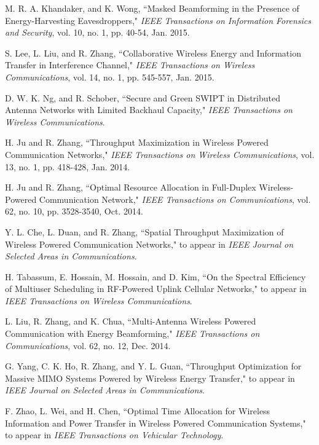 \documentclass[twocolumn,10pt]{IEEEtran}
\begin{document}
\begin{thebibliography}{99}
M. R. A. Khandaker, and K. Wong, ``Masked Beamforming in the Presence of Energy-Harvesting Eavesdroppers," 
\emph{IEEE Transactions on Information Forensics and Security}, vol. 10, no. 1, pp. 40-54, Jan. 2015.

S. Lee, L. Liu, and R. Zhang, 
``Collaborative Wireless Energy and Information Transfer in Interference Channel,"
\emph{IEEE Transactions on Wireless Communications}, 
vol. 14, no. 1,	 pp. 545-557, Jan.  2015.

D. W. K. Ng, and R. Schober, ``Secure and Green SWIPT in Distributed Antenna Networks with Limited Backhaul Capacity," \emph{IEEE Transactions on Wireless Communications}. 

H. Ju and R. Zhang, ``Throughput Maximization in Wireless Powered Communication Networks," \emph{IEEE Transactions on Wireless Communications}, vol. 13, no. 1, pp. 418-428, Jan. 2014. 

H. Ju and R. Zhang, ``Optimal Resource Allocation in Full-Duplex Wireless-Powered Communication Network,"  \emph{IEEE Transactions on Communications},  vol. 62, no. 10,	pp. 3528-3540, Oct. 2014.

Y. L. Che, L. Duan, and R. Zhang, ``Spatial Throughput Maximization of Wireless Powered Communication Networks," to appear in \emph{IEEE Journal on Selected Areas in Communications}. 

H. Tabassum,  E.  Hossain, M.  Hossain, and D. Kim, ``On the Spectral Efficiency of Multiuser Scheduling in RF-Powered Uplink Cellular Networks," to appear in \emph{IEEE Transactions on Wireless Communications}.  







L. Liu, R. Zhang, and K. Chua, ``Multi-Antenna Wireless Powered Communication with Energy Beamforming,"  \emph{IEEE Transactions on Communications}, vol. 62, no. 12, Dec. 2014.

G. Yang, C. K. Ho, R. Zhang, and Y. L. Guan, ``Throughput Optimization for Massive MIMO Systems Powered by Wireless Energy Transfer," to appear in  \emph{IEEE Journal on Selected Areas in Communications}.  

F. Zhao, L. Wei, and  H. Chen, 
``Optimal Time Allocation for Wireless Information and Power Transfer in Wireless Powered Communication Systems,"
to appear in \emph{IEEE Transactions on Vehicular Technology}. 


\end{thebibliography}
\end{document}

